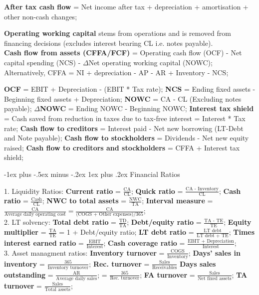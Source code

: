 \documentclass[10pt,landscape]{article}
\makeatletter
\renewcommand{\subsubsection}{\@startsection{subsubsection}{3}{0mm}%
                                {-1ex plus -.5ex minus -.2ex}%
                                {1ex plus .2ex}%
                                {\normalfont\small\bfseries}}
\makeatother
\begin{document}
\begin{multicols}{3}
\textbf{After tax cash flow} = Net income after tax + depreciation +
amortisation + other non-cash changes;

\textbf{Operating working capital} stems from operations and is removed
from financing decisions (excludes interest bearing CL i.e. notes payable). \\

\textbf{Cash flow from assets (CFFA/FCF)} = Operating cash flow (OCF)
- Net capital spending (NCS) - $\Delta$Net operating working capital
(NOWC);
Alternatively, CFFA = NI + depreciation - AP - AR + Inventory - NCS;

\textbf{OCF} = EBIT + Depreciation - (EBIT * Tax rate);
\textbf{NCS} = Ending fixed assets - Beginning fixed assets + Depreciation;
\textbf{NOWC} = CA - CL (Excluding notes payable);
$\Delta$\textbf{NOWC} = Ending NOWC - Beginning NOWC;
\textbf{Interest tax shield} = Cash saved from reduction in taxes due to
tax-free interest = Interest * Tax rate;
\textbf{Cash flow to creditors} = Interest paid - Net new borrowing (LT-Debt
and Note payable);
\textbf{Cash flow to stockholders} = Dividends - Net new equity raised;
\textbf{Cash flow to creditors and stockholders} = CFFA + Interest tax shield;

\subsubsection{Financial Ratios}

1. Liquidity Ratios: 
\textbf{Current ratio} = $\frac{\text{CA}}{\text{CL}}$;
\textbf{Quick ratio} = $\frac{\text{CA - Inventory}}{\text{CL}}$;
\textbf{Cash ratio} = $\frac{\text{Cash}}{\text{CL}}$;
\textbf{NWC to total assets} = $\frac{\text{NWC}}{\text{TA}}$;
\textbf{Interval measure} = $\frac{\text{CA}}{\text{Average daily operating cost}} =
\frac{\text{CA}}{\text{(COGS + Other expenses)/365}}$;
\\

2. LT solvency: 
\textbf{Total debt ratio} = $\frac{\text{TD}}{\text{TA}}$;
\textbf{Debt/equity ratio} = $\frac{\text{TA - TE}}{\text{TE}}$;
\textbf{Equity multiplier} = $\frac{\text{TA}}{\text{TE}}$
= 1 + Debt/equity ratio;
\textbf{LT debt ratio} = $\frac{\text{LT debt}}{\text{LT debt + TE}}$;
\textbf{Times interest earned ratio} = $\frac{\text{EBIT}}{\text{Interest}}$;
\textbf{Cash coverage ratio} = $\frac{\text{EBIT + Depreciation}}
{\text{Interest}}$;
\\

3. Asset managment ratios: 
\textbf{Inventory turnover} = $\frac{\text{COGS}}{\text{Inventory}}$;
\textbf{Days' sales in inventory} = $\frac{\text{365}}{\text{Inventory turnover}}$;
\textbf{Rec. turnover} = $\frac{\text{Sales}}{\text{Receivables}}$
\textbf{Days sales outstanding} = $\frac{\text{AR}}{\text{Average daily sales}}$;
= $\frac{\text{365}}{\text{Rec. turnover}}$;
\textbf{FA turnover} = $\frac{\text{Sales}}{\text{Net fixed assets}}$;
\textbf{TA turnover} = $\frac{\text{Sales}}{\text{Total assets}}$;
\\


\end{multicols}
\end{document}
